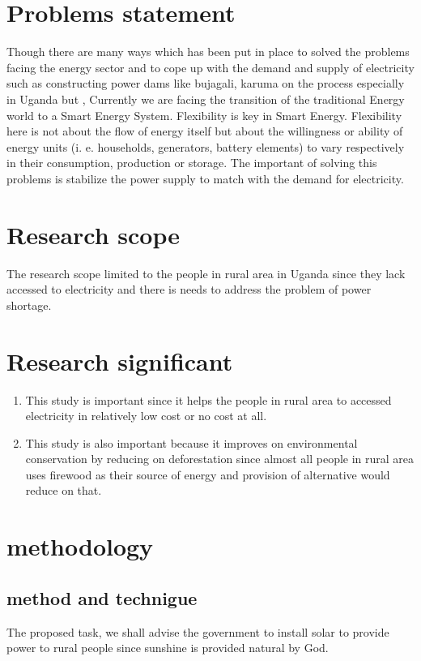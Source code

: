 \documentclass[11pt]{article}
\begin{document}
\section{Problems statement}
Though there are many ways which has been put in place to solved the problems facing the energy sector and to cope up with  the demand and supply of electricity such as constructing power dams like bujagali, karuma  on the process especially in Uganda but , Currently we are facing the transition of the traditional Energy world to a Smart Energy System. Flexibility is key in Smart Energy. Flexibility here is not about the ﬂow of energy itself but about the willingness or ability of energy units (i. e. households, generators, battery elements) to vary respectively in their consumption, production or storage. The important of solving this problems is stabilize the power supply to match with the demand for electricity.  
\section{Research scope}
The research scope limited to the people in rural area in Uganda since they  lack accessed to electricity and  there is needs to address the problem of power shortage.
\section{Research significant}
\begin{enumerate}
\item This study is important since it helps the people in rural area to accessed electricity in relatively low cost or no cost at all.
\item  This study is also important because it improves on environmental conservation by reducing on deforestation since almost all people in rural area uses firewood as their source of energy and provision of alternative would reduce on that.
\end{enumerate}
\section{methodology}
\subsection{method and technigue}
The proposed task, we shall advise the government to install solar to provide power to rural people since sunshine is provided natural by God.
\end{document}

